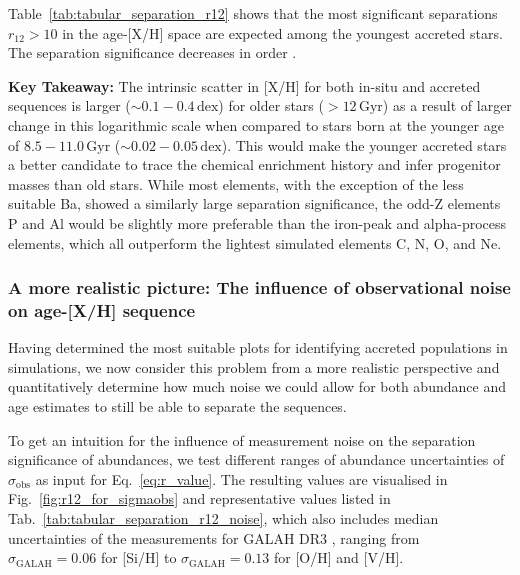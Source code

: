 \documentclass[fleqn,usenatbib]{mnras}
\begin{document}
Table~\ref{tab:tabular_separation_r12} shows that the most significant separations $r_{12} > 10$ in the age-[X/H] space are expected among the youngest accreted stars. The separation significance decreases in order .

\textbf{Key Takeaway:} The intrinsic scatter in {[X/H]} for both in-situ and accreted sequences is larger ($\sim 0.1-0.4\,\mathrm{dex}$) for older stars ($> 12\,\mathrm{Gyr}$) as a result of larger change in this logarithmic scale when compared to stars born at the younger age of $8.5-11.0\,\mathrm{Gyr}$ ($\sim 0.02-0.05\,\mathrm{dex}$). This would make the younger accreted stars a better candidate to trace the chemical enrichment history and infer progenitor masses than old stars. While most elements, with the exception of the less suitable Ba, showed a similarly large separation significance, the odd-Z elements P and Al would be slightly more preferable than the iron-peak and alpha-process elements, which all outperform the lightest simulated elements C, N, O, and Ne.

\subsubsection{A more realistic picture: The influence of observational noise on age-{[X/H]} sequence} \label{sec:noise_influence}

Having determined the most suitable plots for identifying accreted populations in simulations, we now consider this problem from a more realistic perspective and quantitatively determine how much noise we could allow for both abundance and age estimates to still be able to separate the sequences.

To get an intuition for the influence of measurement noise on the separation significance of abundances, we test different ranges of abundance uncertainties of $\sigma_\mathrm{obs}$ as input for Eq.~\ref{eq:r_value}. The resulting values are visualised in Fig.~\ref{fig:r12_for_sigmaobs} and representative values listed in Tab.~\ref{tab:tabular_separation_r12_noise}, which also includes median uncertainties of the measurements for GALAH DR3 \citep{Buder2021}, ranging from $\sigma_\mathrm{GALAH} = 0.06$ for [Si/H] to $\sigma_\mathrm{GALAH} = 0.13$ for [O/H] and [V/H].
\end{document}
